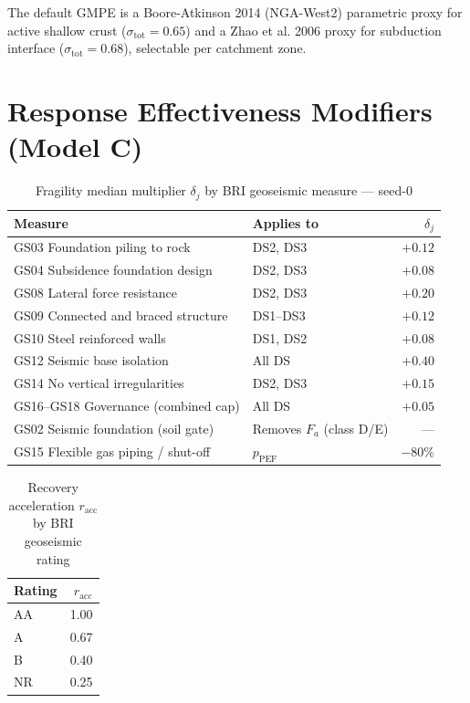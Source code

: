 \documentclass[11pt,a4paper]{article}
\begin{document}
The default GMPE is a Boore-Atkinson 2014 (NGA-West2) parametric proxy for active
shallow crust ($\sigma_{\text{tot}} = 0.65$) and a Zhao et al. 2006 proxy for
subduction interface ($\sigma_{\text{tot}} = 0.68$), selectable per catchment
zone.

\section{Response Effectiveness Modifiers (Model C)}\label{app:resp}

\begin{table}[H]
  \centering
  \caption{Fragility median multiplier $\delta_j$ by BRI geoseismic measure --- seed-0}
  \begin{tabular}{llr}
    \toprule
    \textbf{Measure} & \textbf{Applies to} & \textbf{$\delta_j$} \\
    \midrule
    GS03 Foundation piling to rock        & DS2, DS3 & $+0.12$ \\
    GS04 Subsidence foundation design     & DS2, DS3 & $+0.08$ \\
    GS08 Lateral force resistance         & DS2, DS3 & $+0.20$ \\
    GS09 Connected and braced structure   & DS1--DS3 & $+0.12$ \\
    GS10 Steel reinforced walls           & DS1, DS2 & $+0.08$ \\
    GS12 Seismic base isolation           & All DS   & $+0.40$ \\
    GS14 No vertical irregularities       & DS2, DS3 & $+0.15$ \\
    GS16--GS18 Governance (combined cap)  & All DS   & $+0.05$ \\
    \midrule
    GS02 Seismic foundation (soil gate)   & Removes $F_a$ (class D/E) & --- \\
    GS15 Flexible gas piping / shut-off    & $p_{\text{PEF}}$ & $-80\%$ \\
    \bottomrule
  \end{tabular}
\end{table}

\begin{table}[H]
  \centering
  \caption{Recovery acceleration $r_{\text{acc}}$ by BRI geoseismic rating}
  \begin{tabular}{lr}
    \toprule
    \textbf{Rating} & \textbf{$r_{\text{acc}}$} \\
    \midrule
    AA & 1.00 \\
    A  & 0.67 \\
    B  & 0.40 \\
    NR & 0.25 \\
    \bottomrule
  \end{tabular}
\end{table}
\end{document}
